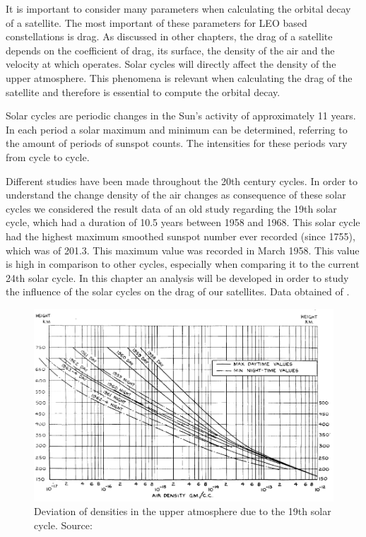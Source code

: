 It is important to consider many parameters when calculating the orbital decay of a satellite. The most important of these parameters for LEO based constellations is drag. As discussed in other chapters, the drag of a satellite depends on the coefficient of drag, its surface, the density of the air and the velocity at which operates. Solar cycles will directly affect the density of the upper atmosphere. This phenomena is relevant when calculating the drag of the satellite and therefore is essential to compute the orbital decay.

Solar cycles are periodic changes in the Sun's activity of approximately 11 years. In each period a solar maximum and minimum can be determined, referring to the amount of periods of sunspot counts. The intensities for these periods vary from cycle to cycle.

Different studies have been made throughout the 20th century cycles. In order to understand the change  density of the air changes as consequence of these solar cycles we considered the result data of an old study regarding the 19th solar cycle, which had a duration of 10.5 years between 1958 and 1968. This solar cycle had the highest maximum smoothed sunspot number ever recorded (since 1755), which was of 201.3. This maximum value was recorded in March 1958. This value is high in comparison to other cycles, especially when comparing it to the current 24th solar cycle. In this chapter an analysis will be developed in order to study the influence of the solar cycles on the drag of our satellites.  Data obtained of \cite{Priester1967}.

\begin{figure}[h]
\includegraphics[width=14cm]{solarcycles}
\centering
\caption[Deviation of densities in the upper atmosphere]{Deviation of densities in the upper atmosphere due to the 19th solar cycle. Source: \cite{Priester1967}}
\end{figure}

